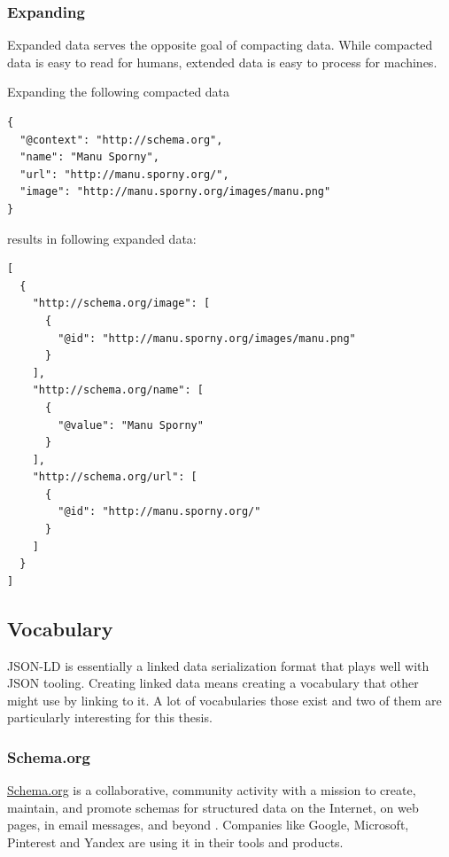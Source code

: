 \subsubsection{Expanding}\label{jsonldextending}

Expanded data serves the opposite goal of compacting data. While compacted data is easy to read for humans, extended data is easy to process for machines.

Expanding the following compacted data

\lstset{language=JSON}
\begin{lstlisting}[caption=Compacted and easy-to-read data of a person]
{
  "@context": "http://schema.org",
  "name": "Manu Sporny",
  "url": "http://manu.sporny.org/",
  "image": "http://manu.sporny.org/images/manu.png"
}
\end{lstlisting}

results in following expanded data:

\lstset{language=JSON}
\begin{lstlisting}[caption=Expanded data of a person that is easy to process for machines]
[
  {
    "http://schema.org/image": [
      {
        "@id": "http://manu.sporny.org/images/manu.png"
      }
    ],
    "http://schema.org/name": [
      {
        "@value": "Manu Sporny"
      }
    ],
    "http://schema.org/url": [
      {
        "@id": "http://manu.sporny.org/"
      }
    ]
  }
]
\end{lstlisting}

\subsection{Vocabulary}

JSON-LD is essentially a linked data serialization format that plays well with JSON tooling. Creating linked data means creating a vocabulary that other might use by linking to it. A lot of vocabularies those exist and two of them are particularly interesting for this thesis.

\subsubsection{Schema.org}

\url{Schema.org} is a collaborative, community activity with a mission to create, maintain, and promote schemas for structured data on the Internet, on web pages, in email messages, and beyond \citep{welcomeschemaorg}. Companies like Google, Microsoft, Pinterest and Yandex are using it in their tools and products.

